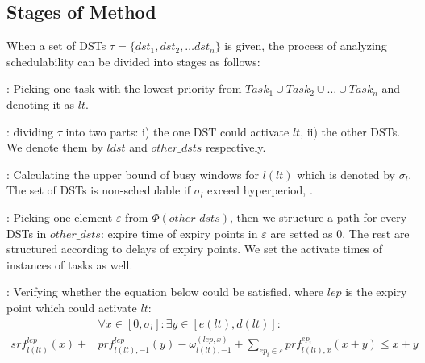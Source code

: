 \documentclass[conference]{IEEEtran}
\begin{document}
\subsection{Stages of Method}\label{section_8steps}
When a set of DSTs $\tau=\{dst_1,dst_2, \dots dst_n\}$ is given, the process of analyzing schedulability can be divided into stages as follows:
\begin{compactenum}

  \item: Picking one task with the lowest priority from $Task_1\cup Task_2\cup\dots\cup Task_n$ and denoting it as $lt$. %
  \item: dividing $\tau$ into two parts: i) the one DST could activate $lt$, ii) the other DSTs. We denote them by $ldst$ and $other\_dsts$ respectively. %

  \item: Calculating the upper bound of busy windows for $l(lt)$ which is denoted by $\sigma_l$. The set of DSTs is non-schedulable if $\sigma_l$ exceed hyperperiod, .%
  
  \item: Picking one element $\varepsilon$ from $\Phi(other\_dsts)$, then we structure a path for every DSTs in $other\_dsts$: expire time of expiry points in $\varepsilon$ are setted as 0. The rest are structured according to delays of expiry points. We set the activate times of instances of tasks as well.%

  \item: Verifying whether the equation below could be satisfied, where $lep$ is the expiry point which could activate $lt$:%
  \begin{equation}\begin{split}
      &\forall x\in[0,\sigma_l]:\exists y\in[e(lt),d(lt)]:\\
      srf^{lep}_{l(lt)}(x)+&prf^{lep}_{l(lt),-1}(y)-\omega^{(lep,x)}_{l(lt),-1}+\sum\limits_{ep_i\in\varepsilon}prf^{ep_i}_{l(lt),x}(x+y)\leq x+y
    \end{split}\label{equation_verify}\end{equation}
  

\end{compactenum}
\end{document}

